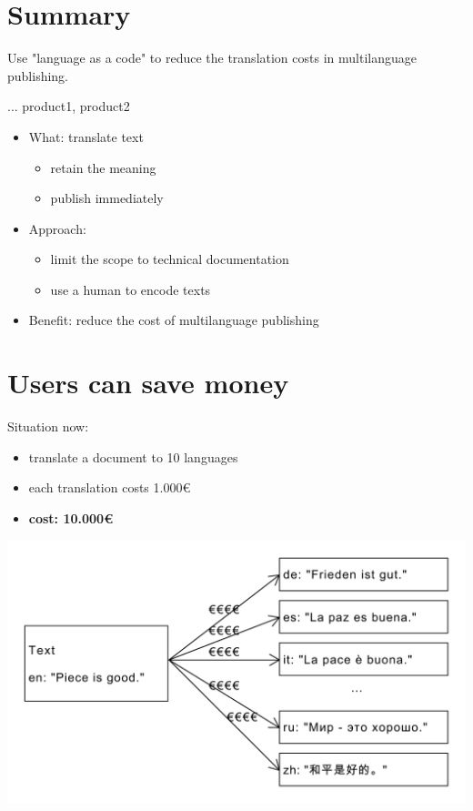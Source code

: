 \documentclass{article}
\begin{document}
\section{Summary}
Use "language as a code" to reduce the translation costs in multilanguage publishing.

... product1, product2

\begin{itemize}
\item What: translate text
  \begin{itemize}
  \item retain the meaning
  \item publish immediately
  \end{itemize}
\item Approach:
  \begin{itemize}
  \item limit the scope to technical documentation
  \item use a human to encode texts
  \end{itemize}
\item Benefit: reduce the cost of multilanguage publishing
\end{itemize}

\section{Users can save money}

Situation now:
\begin{itemize}
\item translate a document to 10 languages
\item each translation costs 1.000€
\item \textbf{cost: 10.000€}
\end{itemize}

\includegraphics[scale=0.4]{dia/user-view-current-world.pdf}
\end{document}
